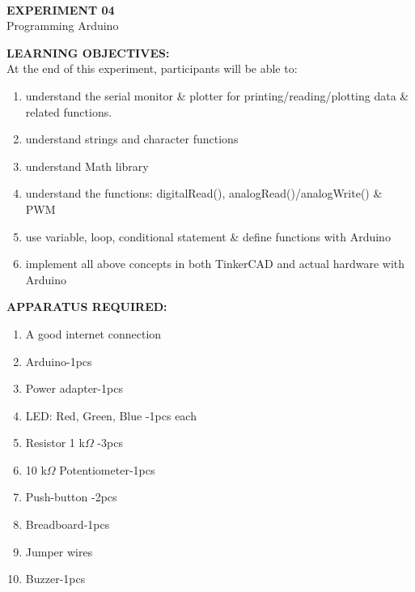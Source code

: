 \documentclass[12pt,a4paper]{article}
\begin{document}
\begin{center}

\textbf{\large \\EXPERIMENT 04 }\\[6pt]
Programming Arduino
\end{center}

\textbf{\large LEARNING OBJECTIVES:}\\[3pt]
At the end of this experiment, participants will be able to:\vspace{-6mm}\begin{enumerate}
 \setlength\itemsep{-0.3em}
\item understand the serial monitor \& plotter for printing/reading/plotting data \& related functions.
\item understand strings and character functions
\item understand Math library
\item understand the functions: digitalRead(), analogRead()/analogWrite() \& PWM
\item use variable, loop, conditional statement \& define functions with Arduino
\item implement all above concepts in both TinkerCAD and actual hardware with Arduino

\end{enumerate}
\textbf{\large APPARATUS REQUIRED:}\\
\vspace{-0.1mm}
\begin{enumerate}
\setlength\itemsep{-0.1em}
\item A good internet connection
\item Arduino-1pcs
\item Power adapter-1pcs
\item LED: Red, Green, Blue -1pcs each
\item Resistor 1 k$\Omega$ -3pcs
\item 10 k$\Omega$ Potentiometer-1pcs
\item Push-button -2pcs
\item Breadboard-1pcs
\item Jumper wires
\item Buzzer-1pcs



\end{enumerate}
\end{document}
